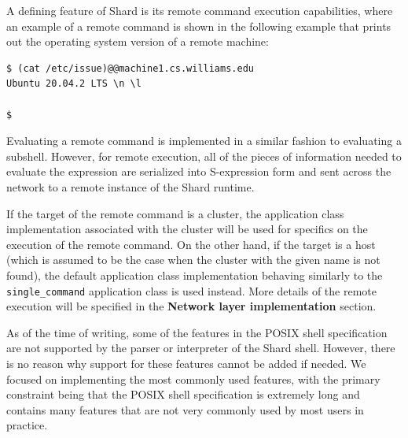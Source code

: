\documentclass[twoside]{report}
\newcommand{\todoi}[1]{\todo[inline, color=blue!20]{TODO: {#1}}}
\begin{document}
A defining feature of Shard is its remote command execution capabilities, where an example of a remote command is shown in the following example that prints out the operating system version of a remote machine:

\begin{minipage}[c]{\textwidth-15pt}
  \begin{lstlisting}[language=shard]
$ (cat /etc/issue)@@machine1.cs.williams.edu
Ubuntu 20.04.2 LTS \n \l

$
\end{lstlisting}
  \smallskip
\end{minipage}

Evaluating a remote command is implemented in a similar fashion to evaluating a subshell.
However, for remote execution, all of the pieces of information needed to evaluate the expression are serialized into S-expression form and sent across the network to a remote instance of the Shard runtime.

If the target of the remote command is a cluster, the application class implementation associated with the cluster will be used for specifics on the execution of the remote command.
On the other hand, if the target is a host (which is assumed to be the case when the cluster with the given name is not found), the default application class implementation behaving similarly to the \texttt{single\_command} application class is used instead.
More details of the remote execution will be specified in the \textbf{Network layer implementation} section.


As of the time of writing, some of the features in the POSIX shell specification are not supported by the parser or interpreter of the Shard shell.
However, there is no reason why support for these features cannot be added if needed.
We focused on implementing the most commonly used features, with the primary constraint being that the POSIX shell specification is extremely long and contains many features that are not very commonly used by most users in practice.
\end{document}
